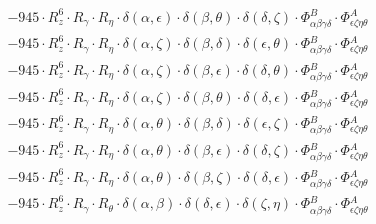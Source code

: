 \documentclass{article}
\begin{document}
\begin{equation}
\begin{array}{c}
 \\[0.2em] 		 - 945 \cdot R_{z}^{6} \cdot R_{\gamma{}} \cdot R_{\eta{}} \cdot \delta{}\left(\alpha{}, \epsilon{}\right) \cdot \delta{}\left(\beta{}, \theta{}\right) \cdot \delta{}\left(\delta{}, \zeta{}\right) \cdot \Phi{}^{B}_{\alpha{}\beta{}\gamma{}\delta{}} \cdot \Phi{}^{A}_{\epsilon{}\zeta{}\eta{}\theta{}} 
 \\[0.2em] 		 - 945 \cdot R_{z}^{6} \cdot R_{\gamma{}} \cdot R_{\eta{}} \cdot \delta{}\left(\alpha{}, \zeta{}\right) \cdot \delta{}\left(\beta{}, \delta{}\right) \cdot \delta{}\left(\epsilon{}, \theta{}\right) \cdot \Phi{}^{B}_{\alpha{}\beta{}\gamma{}\delta{}} \cdot \Phi{}^{A}_{\epsilon{}\zeta{}\eta{}\theta{}} 
 \\[0.2em] 		 - 945 \cdot R_{z}^{6} \cdot R_{\gamma{}} \cdot R_{\eta{}} \cdot \delta{}\left(\alpha{}, \zeta{}\right) \cdot \delta{}\left(\beta{}, \epsilon{}\right) \cdot \delta{}\left(\delta{}, \theta{}\right) \cdot \Phi{}^{B}_{\alpha{}\beta{}\gamma{}\delta{}} \cdot \Phi{}^{A}_{\epsilon{}\zeta{}\eta{}\theta{}} 
 \\[0.2em] 		 - 945 \cdot R_{z}^{6} \cdot R_{\gamma{}} \cdot R_{\eta{}} \cdot \delta{}\left(\alpha{}, \zeta{}\right) \cdot \delta{}\left(\beta{}, \theta{}\right) \cdot \delta{}\left(\delta{}, \epsilon{}\right) \cdot \Phi{}^{B}_{\alpha{}\beta{}\gamma{}\delta{}} \cdot \Phi{}^{A}_{\epsilon{}\zeta{}\eta{}\theta{}} 
 \\[0.2em] 		 - 945 \cdot R_{z}^{6} \cdot R_{\gamma{}} \cdot R_{\eta{}} \cdot \delta{}\left(\alpha{}, \theta{}\right) \cdot \delta{}\left(\beta{}, \delta{}\right) \cdot \delta{}\left(\epsilon{}, \zeta{}\right) \cdot \Phi{}^{B}_{\alpha{}\beta{}\gamma{}\delta{}} \cdot \Phi{}^{A}_{\epsilon{}\zeta{}\eta{}\theta{}} 
 \\[0.2em] 		 - 945 \cdot R_{z}^{6} \cdot R_{\gamma{}} \cdot R_{\eta{}} \cdot \delta{}\left(\alpha{}, \theta{}\right) \cdot \delta{}\left(\beta{}, \epsilon{}\right) \cdot \delta{}\left(\delta{}, \zeta{}\right) \cdot \Phi{}^{B}_{\alpha{}\beta{}\gamma{}\delta{}} \cdot \Phi{}^{A}_{\epsilon{}\zeta{}\eta{}\theta{}} 
 \\[0.2em] 		 - 945 \cdot R_{z}^{6} \cdot R_{\gamma{}} \cdot R_{\eta{}} \cdot \delta{}\left(\alpha{}, \theta{}\right) \cdot \delta{}\left(\beta{}, \zeta{}\right) \cdot \delta{}\left(\delta{}, \epsilon{}\right) \cdot \Phi{}^{B}_{\alpha{}\beta{}\gamma{}\delta{}} \cdot \Phi{}^{A}_{\epsilon{}\zeta{}\eta{}\theta{}} 
 \\[0.2em] 		 - 945 \cdot R_{z}^{6} \cdot R_{\gamma{}} \cdot R_{\theta{}} \cdot \delta{}\left(\alpha{}, \beta{}\right) \cdot \delta{}\left(\delta{}, \epsilon{}\right) \cdot \delta{}\left(\zeta{}, \eta{}\right) \cdot \Phi{}^{B}_{\alpha{}\beta{}\gamma{}\delta{}} \cdot \Phi{}^{A}_{\epsilon{}\zeta{}\eta{}\theta{}} 

\end{array}
\end{equation}
\end{document}
